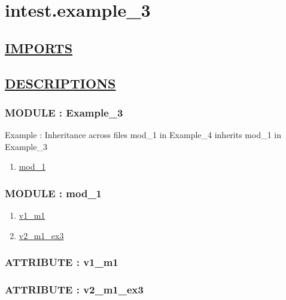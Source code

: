 \chapter*{intest.example\_3}

\section*{\underline{IMPORTS}}

\section*{\underline{DESCRIPTIONS}}
\subsection*{MODULE : Example\_3}
\hypertarget{ecldoc:intest.example_3_intest.Example_3}{}
Example : Inheritance across files mod\_1 in Example\_4 inherits mod\_1 in Example\_3 \\
\begin{enumerate}
\item \hyperlink{ecldoc:intest.example_3_intest.Example_3.mod_1}{mod\_1}
\end{enumerate}
\subsection*{MODULE : mod\_1}
\hypertarget{ecldoc:intest.example_3_intest.Example_3.mod_1}{}
\begin{enumerate}
\item \hyperlink{ecldoc:intest.example_3_intest.example_3.mod_1.v1_m1}{v1\_m1}
\item \hyperlink{ecldoc:intest.example_3_intest.example_3.mod_1.v2_m1_ex3}{v2\_m1\_ex3}
\end{enumerate}
\subsection*{ATTRIBUTE : v1\_m1}
\hypertarget{ecldoc:intest.example_3_intest.example_3.mod_1.v1_m1}{}
\subsection*{ATTRIBUTE : v2\_m1\_ex3}
\hypertarget{ecldoc:intest.example_3_intest.example_3.mod_1.v2_m1_ex3}{}


